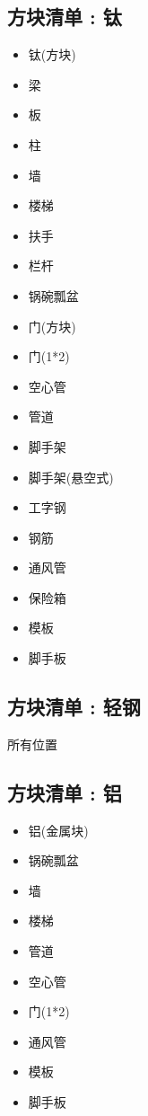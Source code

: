 {  \subsection{方块清单 : 钛}{
      \begin{itemize}
          \item 钛(方块)
          \item 梁
          \item 板
          \item 柱
          \item 墙
          \item 楼梯
          \item 扶手
          \item 栏杆
          \item 锅碗瓢盆
          \item 门(方块)
          \item 门(1*2)
          \item 空心管
          \item 管道
          \item 脚手架
          \item 脚手架(悬空式)
          \item 工字钢
          \item 钢筋
          \item 通风管
          \item 保险箱
          \item 模板
          \item 脚手板
      \end{itemize}
  }

  \subsection{方块清单 : 轻钢}{
      所有位置
  }

  \subsection{方块清单 : 铝}{
      \begin{itemize}
          \item 铝(金属块)
          \item 锅碗瓢盆
          \item 墙
          \item 楼梯
          \item 管道
          \item 空心管
          \item 门(1*2)
          \item 通风管
          \item 模板
          \item 脚手板
      \end{itemize}
  }

}
